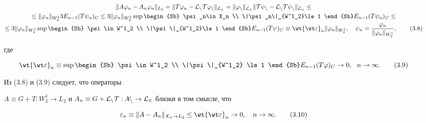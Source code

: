 \begin{multline}


\|A\vp_n-A_n\vp_n\|_{L_2}=\|T\vp_n-\rL_nT\vp_n\|_{L_2}=


\|\vp_n\|_{L_2}


\|T\psi_n-\rL_nT\psi_n\|_{L_2} \le  \\


%


\le \|\vp_n\|_{W^1_2} 3E_{n-1}(T\psi_n)_C\le 3\|\vp_n\|_{W^1_2}


\sup \begin{Sb} \psi_n\in X_n \\ \|\psi_n\|_{W^1_2}\le 1 \end{Sb}


E_{n-1}(T\psi_n)_C\le \\


%


\le 3\|\vp_n\|_{W^1_2}


\sup \begin{Sb} \psi\in W^1_2 \\ \|\psi\|_{W^1_2}\le 1 \end{Sb}


E_{n-1}(T\psi)_C\equiv\wt{\wt\ve}_n\|\vp_n\|_{W^1_2},\quad\psi_n=


\frac{\vp_n}{\|\vp_n\|_{W^1_2}},


\tag{3.8}


\end{multline}


где 


\begin{equation}


\wt{\wt\ve}_n\equiv


\sup \begin{Sb} \psi\in W^1_2 \\ \|\psi\|_{W^1_2}


\le 1 \end{Sb} E_{n-1}(T\vp)_C\to 0,\ \ n\to\infty.


\tag{3.9}


\end{equation}


Из (3.8) и (3.9) следует, что операторы


$A\equiv G+T:W^1_2\to L_2$ и $A_n\equiv G+


\rL_nT: X_n\to L_2$ близки в том смысле, что


\begin{equation}


\ve_n \equiv \|A-A_n\|_{X_n\to L_2}\le\wt{\wt\ve}_n\to 0,\quad n\to 


\infty.


\tag{3.10}


\end{equation}





